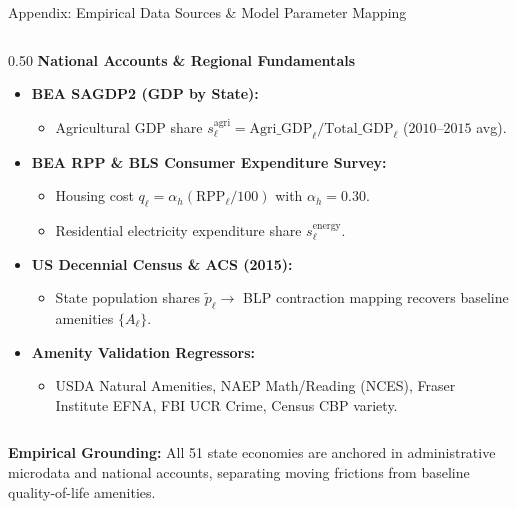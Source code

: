 \documentclass[aspectratio=169, 10pt]{beamer}
\begin{document}
\begin{frame}{Appendix: Empirical Data Sources \& Model Parameter Mapping \hfill \hyperlink{main:calibration}{\scriptsize{}}}
\begin{columns}[T]
        \begin{column}{0.50\textwidth}
            \textbf{\small National Accounts \& Regional Fundamentals}
            \vspace{0.04cm}
            \begin{itemize}\scriptsize\setlength{\itemsep}{2pt}
                \item \textbf{BEA SAGDP2 (GDP by State):}
                \begin{itemize}\tiny
                    \item Agricultural GDP share $s_\ell^{\text{agri}} = \text{Agri\_GDP}_\ell/\text{Total\_GDP}_\ell$ ($2010\text{--}2015$ avg).
                \end{itemize}
                \item \textbf{BEA RPP \& BLS Consumer Expenditure Survey:}
                \begin{itemize}\tiny
                    \item Housing cost $q_\ell = \alpha_h (\text{RPP}_\ell / 100)$ with $\alpha_h = 0.30$.
                    \item Residential electricity expenditure share $s_\ell^{\text{energy}}$.
                \end{itemize}
                \item \textbf{US Decennial Census \& ACS (2015):}
                \begin{itemize}\tiny
                    \item State population shares $\tilde{p}_\ell \to$ BLP contraction mapping recovers baseline amenities $\{A_\ell\}$.
                \end{itemize}
                \item \textbf{Amenity Validation Regressors:}
                \begin{itemize}\tiny
                    \item USDA Natural Amenities, NAEP Math/Reading (NCES), Fraser Institute EFNA, FBI UCR Crime, Census CBP variety.
                \end{itemize}
            \end{itemize}
        \end{column}
    \end{columns}
    \vspace{0.05cm}
    \begin{tcolorbox}[takeawaybox]
        \scriptsize \textbf{Empirical Grounding:} All 51 state economies are anchored in administrative microdata and national accounts, separating moving frictions from baseline quality-of-life amenities.
    \end{tcolorbox}
\end{frame}
\end{document}
